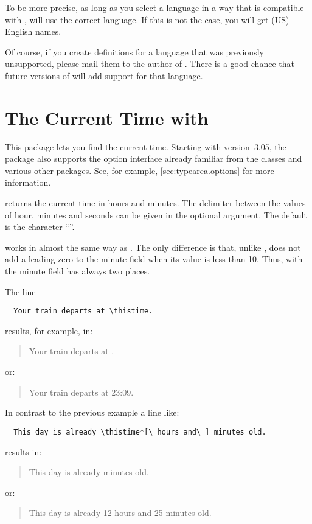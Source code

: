 \begin{Explain}
  To be more precise, as long as you select a language in a way that is
  compatible with ,  will
  use the correct language. If this is not the case, you will get (US) English
  names.
\end{Explain}

Of course, if you create definitions for a language that was previously
unsupported, please mail them to the author of \KOMAScript{}. There is a good
chance that future versions of \KOMAScript{} will add support for that
language.%
\EndIndexGroup
%
\EndIndexGroup


\chapter{The Current Time with }
\BeginIndexGroup
{}

This package lets you find the current time. Starting with version~3.05, the
package also supports the option interface already familiar from the
\KOMAScript{} classes and various other \KOMAScript{} packages. See, for
example, \autoref{sec:typearea.options} for more information.

\begin{Declaration}%
\end{Declaration}%
 returns the current time in hours and minutes.
The delimiter between the values of hour, minutes and seconds can be given in
the optional argument. The default is the character ``\PValue{:}''.

 works in almost the same way as . The only
difference is that, unlike ,  does not add a
leading zero to the minute field when its value is less than 10. Thus, with
 the minute field has always two places.
\begin{Example}
  The line
\begin{lstlisting}
  Your train departs at \thistime.
\end{lstlisting}
  results, for example, in:
  \begin{quote}
    Your train departs at \thistime.
  \end{quote}
  or:
  \begin{quote}
    Your train departs at 23:09.
  \end{quote}
  \bigskip
  In contrast to the previous example a line like:
\begin{lstlisting}
  This day is already \thistime*[\ hours and\ ] minutes old.
\end{lstlisting}
  results in:
  \begin{quote}
    This day is already  minutes old.
  \end{quote}
  or:
  \begin{quote}
    This day is already 12 hours and 25 minutes old.
  \end{quote}
\end{Example}
\EndIndexGroup


